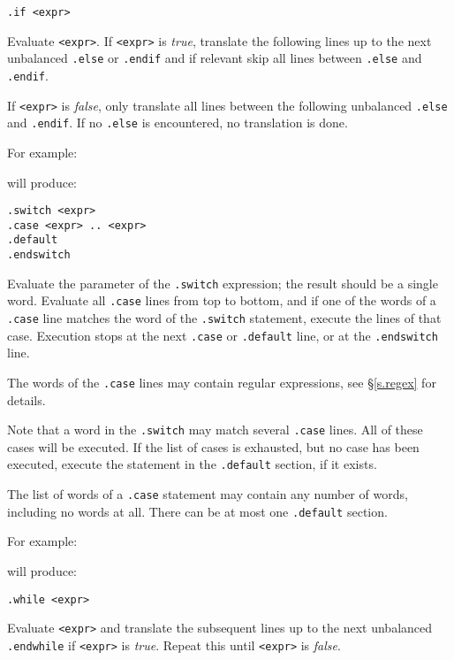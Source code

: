 \begin{verbatim}
.if <expr>
\end{verbatim}
\begin{desc}
Evaluate \texttt{<expr>}.
If \texttt{<expr>} is \textit{true},
translate the following lines up to the next unbalanced
\texttt{.else} or \texttt{.endif}
and if relevant skip all lines between \texttt{.else} and \texttt{.endif}.

If \texttt{<expr>} is \textit{false},
only translate all lines between the following unbalanced
\texttt{.else} and \texttt{.endif}.
If no \texttt{.else} is encountered, no translation is done.

For example:
\begin{showfile}

\end{showfile}
will produce:
\begin{showfile}

\end{showfile}
\end{desc}
\begin{verbatim}
.switch <expr>
.case <expr> .. <expr>
.default
.endswitch
\end{verbatim}
\begin{desc}
Evaluate the parameter of the \verb'.switch' expression; the result
should be a single word. Evaluate all \verb'.case' lines from top
to bottom, and if one of the words of a \verb'.case' line matches
the word of the \verb'.switch' statement, execute the lines of that case.
Execution stops at the next \verb'.case' or \verb'.default' line,
or at the \verb'.endswitch' line.

The words of the \verb'.case' lines may contain regular
expressions, see \S\ref{s.regex} for details.

Note that a word in the \verb'.switch' may match several \verb'.case'
lines. All of these cases will be executed.
If the list of cases is exhausted, but no case has been executed,
execute the statement in the \verb'.default' section, if it exists.

The list of words of a \verb'.case' statement may contain any number of words,
including no words at all. There can be at most one \verb'.default'
section.

For example:
\begin{showfile}

\end{showfile}
will produce:
\begin{showfile}

\end{showfile}
\end{desc}
\begin{verbatim}
.while <expr>
\end{verbatim}
\begin{desc}
Evaluate \texttt{<expr>} and translate the subsequent lines up to the next
unbalanced \texttt{.endwhile} if \texttt{<expr>} is \textit{true}.
Repeat this until \texttt{<expr>} is \textit{false}.
\end{desc}
